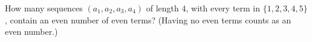 How many sequences $(a_1,a_2,a_3,a_4)$ of length $4$, with every term in $\{1,2,3,4,5\}$, contain an even number of even terms? (Having no even terms counts as an even number.)
